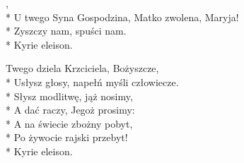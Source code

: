 \begin{lyrics}[longestline={U twego Syna Gospodzina, Matko zwolena, Maryja!}]

,\\*
U twego Syna Gospodzina, Matko zwolena, Maryja!\\*
Zyszczy nam, spuści nam.\\*
Kyrie eleison.

Twego dziela Krzciciela, Bożyszcze,\\*
Usłysz głosy, napełń myśli człowiecze.\\*
Słysz modlitwę, jąż nosimy,\\*
A dać raczy, Jegoż prosimy:\\*
A na świecie zbożny pobyt,\\*
Po żywocie rajski przebyt!\\*
Kyrie eleison.
\end{lyrics}




